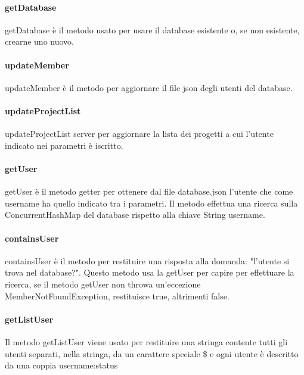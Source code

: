 \documentclass[]{article}
\begin{document}
\paragraph{getDatabase}
getDatabase è il metodo usato per usare il database esistente o, se non esistente, crearne uno nuovo.
\paragraph{updateMember}
updateMember è il metodo per aggiornare il file json degli utenti del database.
\paragraph{updateProjectList}
updateProjectList server per aggiornare la lista dei progetti a cui l'utente indicato nei parametri è iscritto.
\paragraph{getUser}
getUser è il metodo getter per ottenere dal file database.json l'utente che come username ha quello indicato tra i parametri. Il metodo effettua una ricerca sulla ConcurrentHashMap del database rispetto alla chiave String username.
\paragraph{containsUser}
containsUser è il metodo per restituire una risposta alla domanda: "l'utente si trova nel database?". Questo metodo usa la getUser per capire per effettuare la ricerca, se il metodo getUser non throwa un'eccezione MemberNotFoundException, restituisce true, altrimenti false.
\paragraph{getListUser}
Il metodo getListUser viene usato per restituire una stringa contente tutti gli utenti separati, nella stringa, da un carattere speciale \$ e ogni utente è descritto da una coppia username:status
\end{document}
